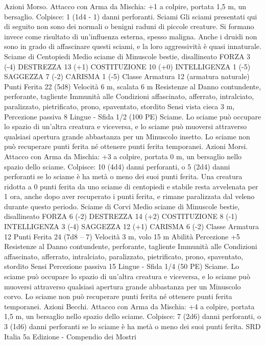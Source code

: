 \begin{multicols}{2}
Azioni
Morso. Attacco con Arma da Mischia: +1 a colpire, portata 1,5
m, un bersaglio.
Colpisce: 1 (1d4 - 1) danni perforanti.
Sciami
Gli sciami presentati qui di seguito non sono dei normali
o benigni raduni di piccole creature. Si formano invece
come risultato di un’influenza esterna, spesso maligna.
Anche i druidi non sono in grado di affascinare questi
sciami, e la loro aggressività è quasi innaturale.
Sciame di Centopiedi
Medio sciame di Minuscole bestie, disallineato
FORZA 3 (-4)
DESTREZZA 13 (+1)
COSTITUZIONE 10 (+0)
INTELLIGENZA 1 (-5)
SAGGEZZA 7 (-2)
CARISMA 1 (-5)
Classe Armatura 12 (armatura naturale)
Punti Ferita 22 (5d8)
Velocità 6 m, scalata 6 m
Resistenze al Danno contundente, perforante, tagliente
Immunità alle Condizioni affascinato, afferrato, intralciato,
paralizzato, pietrificato, prono, spaventato, stordito
Sensi vista cieca 3 m, Percezione passiva 8
Lingue -
Sfida 1/2 (100 PE)
Sciame. Lo sciame può occupare lo spazio di un’altra creatura e
viceversa, e lo sciame può muoversi attraverso qualsiasi apertura
grande abbastanza per un Minuscolo insetto. Lo sciame non può
recuperare punti ferita né ottenere punti ferita temporanei.
Azioni
Morsi. Attacco con Arma da Mischia: +3 a colpire, portata 0 m,
un bersaglio nello spazio dello sciame.
Colpisce: 10 (4d4) danni perforanti, o 5 (2d4) danni perforanti se
lo sciame è ha metà o meno dei suoi punti ferita. Una creatura
ridotta a 0 punti ferita da uno sciame di centopiedi e stabile resta
avvelenata per 1 ora, anche dopo aver recuperato i punti ferita, e
rimane paralizzata dal veleno durante questo periodo.
Sciame di Corvi
Medio sciame di Minuscole bestie, disallineato
FORZA 6 (-2)
DESTREZZA 14 (+2)
COSTITUZIONE 8 (-1)
INTELLIGENZA 3 (-4)
SAGGEZZA 12 (+1)
CARISMA 6 (-2)
Classe Armatura 12
Punti Ferita 24 (7d8 – 7)
Velocità 3 m, volo 15 m
Abilità Percezione +5
Resistenze al Danno contundente, perforante, tagliente
Immunità alle Condizioni affascinato, afferrato, intralciato,
paralizzato, pietrificato, prono, spaventato, stordito
Sensi Percezione passiva 15
Lingue -
Sfida 1/4 (50 PE)
Sciame. Lo sciame può occupare lo spazio di un’altra creatura e
viceversa, e lo sciame può muoversi attraverso qualsiasi apertura
grande abbastanza per un Minuscolo corvo. Lo sciame non può
recuperare punti ferita né ottenere punti ferita temporanei.
Azioni
Becchi. Attacco con Arma da Mischia: +4 a colpire, portata 1,5
m, un bersaglio nello spazio dello sciame.
Colpisce: 7 (2d6) danni perforanti, o 3 (1d6) danni perforanti se
lo sciame è ha metà o meno dei suoi punti ferita.
SRD Italia 5a Edizione - Compendio dei Mostri

\end{multicols}
